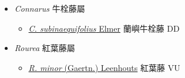 
  \begin{itemize}
 \item[] \textit{Connarus} 牛栓藤屬
                    
  \begin{itemize}
        \item[] \href{http://www.theplantlist.org/tpl1.1/search?q=Connarus+subinaequifolius}{\textit{C. subinaequifolius} Elmer}   蘭嶼牛栓藤 DD
  \end{itemize}
 \item[] \textit{Rourea} 紅葉藤屬
                    
  \begin{itemize}
        \item[] \href{http://www.theplantlist.org/tpl1.1/search?q=Rourea+minor}{\textit{R. minor} (Gaertn.) Leenhouts}   紅葉藤 VU
  \end{itemize}
  \end{itemize}

